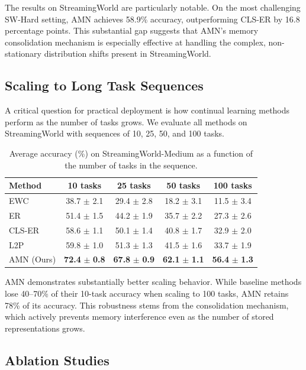 \documentclass[11pt]{article}
\begin{document}
The results on StreamingWorld are particularly notable. On the most challenging SW-Hard setting, AMN achieves 58.9\% accuracy, outperforming CLS-ER by 16.8 percentage points. This substantial gap suggests that AMN's memory consolidation mechanism is especially effective at handling the complex, non-stationary distribution shifts present in StreamingWorld.


\subsection{Scaling to Long Task Sequences}

A critical question for practical deployment is how continual learning methods perform as the number of tasks grows. We evaluate all methods on StreamingWorld with sequences of 10, 25, 50, and 100 tasks.

\begin{table}[h]
\centering
\caption{Average accuracy (\%) on StreamingWorld-Medium as a function of the number of tasks in the sequence.}
\label{tab:scaling}
\begin{tabular}{@{}lcccc@{}}
\toprule
Method & 10 tasks & 25 tasks & 50 tasks & 100 tasks \\
\midrule
EWC & 38.7 $\pm$ 2.1 & 29.4 $\pm$ 2.8 & 18.2 $\pm$ 3.1 & 11.5 $\pm$ 3.4 \\
ER & 51.4 $\pm$ 1.5 & 44.2 $\pm$ 1.9 & 35.7 $\pm$ 2.2 & 27.3 $\pm$ 2.6 \\
CLS-ER & 58.6 $\pm$ 1.1 & 50.1 $\pm$ 1.4 & 40.8 $\pm$ 1.7 & 32.9 $\pm$ 2.0 \\
L2P & 59.8 $\pm$ 1.0 & 51.3 $\pm$ 1.3 & 41.5 $\pm$ 1.6 & 33.7 $\pm$ 1.9 \\
\midrule
AMN (Ours) & \textbf{72.4} $\pm$ \textbf{0.8} & \textbf{67.8} $\pm$ \textbf{0.9} & \textbf{62.1} $\pm$ \textbf{1.1} & \textbf{56.4} $\pm$ \textbf{1.3} \\
\bottomrule
\end{tabular}
\end{table}

AMN demonstrates substantially better scaling behavior. While baseline methods lose 40--70\% of their 10-task accuracy when scaling to 100 tasks, AMN retains 78\% of its accuracy. This robustness stems from the consolidation mechanism, which actively prevents memory interference even as the number of stored representations grows.

\subsection{Ablation Studies}
\end{document}
